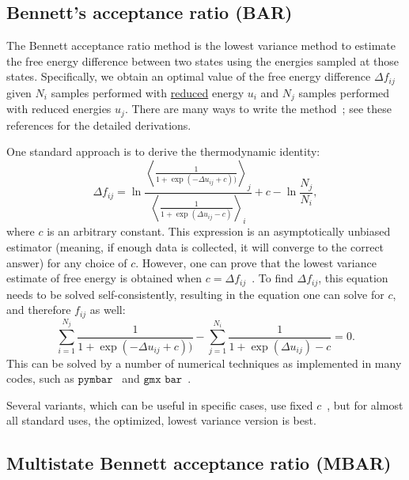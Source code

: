 \documentclass[9pt,review]{livecoms}
\begin{document}
\subsection{Bennett's acceptance ratio (BAR)}

The Bennett acceptance ratio method is the lowest variance method to estimate the free energy difference between two states using the energies sampled at those states. Specifically, we
obtain an optimal value of the free energy difference $\Delta f_{ij}$ given $N_i$ samples performed with \hyperlink{ref:reduced} {reduced} energy $u_i$ and $N_j$ samples performed with reduced energies $u_j$. There are many ways to write
the method~\cite{bennett:jcp:1976:fe-estimate,shirts_comparison_2005,fenwick-escobedo:jcp:2003:replica-exchange-expanded-ensembles}; see these references for the detailed derivations.

One standard approach is to derive the thermodynamic identity:
\begin{equation}
\Delta f_{ij} = \ln \frac{\left\langle \frac{1}{1 + \exp(-\Delta u_{ij}+c))}\right\rangle_j}{\left \langle \frac{1}{1 + \exp(\Delta u_{ij}-c)}\right\rangle_i} + c-\ln\frac{N_j}{N_i},
\end{equation}
where $c$ is an arbitrary constant. This expression is an asymptotically unbiased estimator (meaning, if enough data is collected, it will converge to the correct answer) for any choice
of $c$. However, one can prove that the lowest variance estimate of free energy is obtained when $c=\Delta f_{ij}$~\cite{bennett:jcp:1976:fe-estimate}. To find $\Delta f_{ij}$, this equation needs to be solved self-consistently, resulting in the equation one can solve for $c$, and therefore $f_{ij}$ as well:
\begin{equation}
\sum_{i=1}^{N_j} \frac{1}{1 + \exp(-\Delta u_{ij}+c))} - \sum_{j=1}^{N_i} \frac{1}{1 + \exp(\Delta u_{ij})-c} = 0.
\end{equation}
This can be solved by a number of numerical techniques as implemented in many codes, such as $\texttt{pymbar}$~\cite{shirts-chodera:jcp:2008:mbar} and $\texttt{gmx bar}$~\cite{lindahl_2021}.

Several variants, which can be useful in specific cases, use fixed $c$~\cite{fenwick-escobedo:jcp:2003:replica-exchange-expanded-ensembles,Paliwal_comparison_2011}, but for almost all standard uses, the optimized, lowest variance version is best.


\subsection{Multistate Bennett acceptance ratio (MBAR)}
\end{document}
